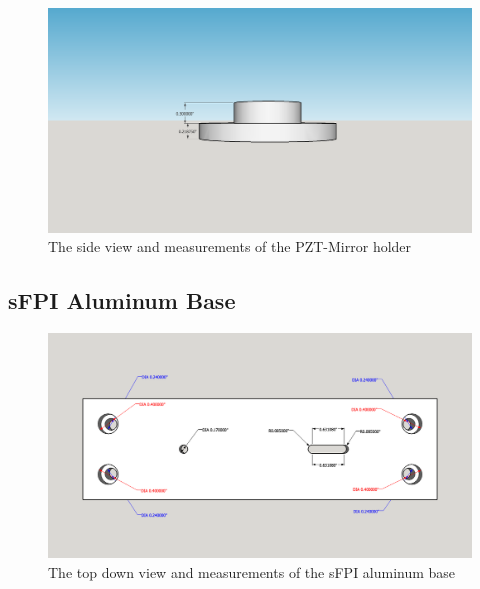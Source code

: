 \documentclass[12pt,journal]{IEEEtran}
\begin{document}
\begin{appendices}
\begin{figure}[h!]
  \centering
	\includegraphics[width=\textwidth]{./mechanical/PZT_holder_side.png}
	\caption[Cavity Mounts]{The side view and measurements of the PZT-Mirror holder}
	\label{fig:PZT-holder-side}
\end{figure}  

\newpage

\subsection{sFPI Aluminum Base} \label{ss:sfpilensholder}

\begin{figure}[h!]
  \centering
	\includegraphics[width=\textwidth]{./mechanical/sfpilensholder_top.png}
	\caption[Cavity Mounts]{The top down view and measurements of the sFPI aluminum base}
	\label{fig:sfpilensholder-top}
\end{figure}  
\newpage


\end{appendices}
\end{document}
